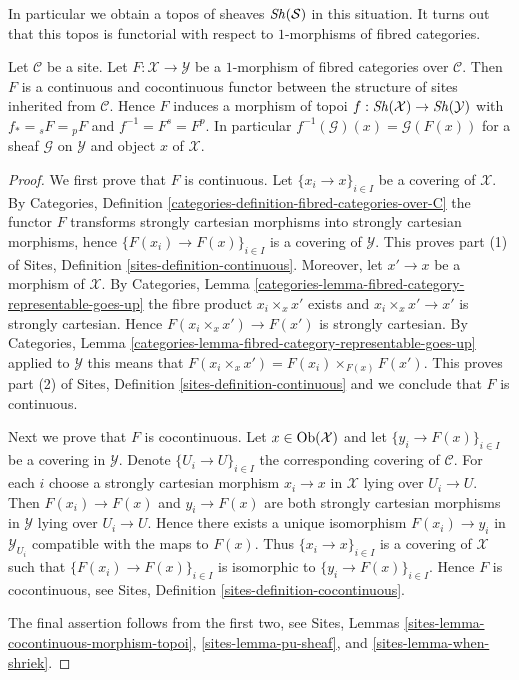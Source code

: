 \noindent
In particular we obtain a topos of sheaves $\mathop{\mathit{Sh}}\nolimits(\mathcal{S})$
in this situation. It turns out that this topos is functorial with respect
to $1$-morphisms of fibred categories.

\begin{lemma}
\label{lemma-topology-inherited-functorial}
Let $\mathcal{C}$ be a site. Let $F : \mathcal{X} \to \mathcal{Y}$
be a $1$-morphism of fibred categories over $\mathcal{C}$.
Then $F$ is a continuous and cocontinuous functor between the structure
of sites inherited from $\mathcal{C}$. Hence $F$ induces a morphism of topoi
$f : \mathop{\mathit{Sh}}\nolimits(\mathcal{X}) \to \mathop{\mathit{Sh}}\nolimits(\mathcal{Y})$ with
$f_* = {}_sF = {}_pF$ and $f^{-1} = F^s = F^p$. In particular
$f^{-1}(\mathcal{G})(x) = \mathcal{G}(F(x))$
for a sheaf $\mathcal{G}$ on $\mathcal{Y}$ and object $x$ of $\mathcal{X}$.
\end{lemma}

\begin{proof}
We first prove that $F$ is continuous.
Let $\{x_i \to x\}_{i \in I}$ be a covering of $\mathcal{X}$. By
Categories, Definition \ref{categories-definition-fibred-categories-over-C}
the functor $F$ transforms strongly cartesian morphisms into strongly
cartesian morphisms, hence $\{F(x_i) \to F(x)\}_{i \in I}$ is a covering
of $\mathcal{Y}$. This proves part (1) of
Sites, Definition \ref{sites-definition-continuous}.
Moreover, let $x' \to x$ be a morphism of $\mathcal{X}$. By
Categories, Lemma \ref{categories-lemma-fibred-category-representable-goes-up}
the fibre product $x_i \times_x x'$ exists and $x_i \times_x x' \to x'$
is strongly cartesian. Hence $F(x_i \times_x x') \to F(x')$ is strongly
cartesian. By
Categories, Lemma \ref{categories-lemma-fibred-category-representable-goes-up}
applied to $\mathcal{Y}$ this means that
$F(x_i \times_x x') = F(x_i) \times_{F(x)} F(x')$.
This proves part (2) of
Sites, Definition \ref{sites-definition-continuous}
and we conclude that $F$ is continuous.

\medskip\noindent
Next we prove that $F$ is cocontinuous.
Let $x \in \mathop{\mathrm{Ob}}\nolimits(\mathcal{X})$ and let $\{y_i \to F(x)\}_{i \in I}$
be a covering in $\mathcal{Y}$. Denote $\{U_i \to U\}_{i \in I}$ the
corresponding covering of $\mathcal{C}$. For each $i$ choose a strongly
cartesian morphism $x_i \to x$ in $\mathcal{X}$ lying over $U_i \to U$.
Then $F(x_i) \to F(x)$ and $y_i \to F(x)$ are both strongly cartesian
morphisms in $\mathcal{Y}$ lying over $U_i \to U$. Hence there exists
a unique isomorphism $F(x_i) \to y_i$ in $\mathcal{Y}_{U_i}$ compatible
with the maps to $F(x)$. Thus $\{x_i \to x\}_{i \in I}$ is a covering of
$\mathcal{X}$ such that $\{F(x_i) \to F(x)\}_{i \in I}$ is isomorphic to
$\{y_i \to F(x)\}_{i \in I}$. Hence $F$ is cocontinuous, see
Sites, Definition \ref{sites-definition-cocontinuous}.

\medskip\noindent
The final assertion follows from the first two, see
Sites, Lemmas
\ref{sites-lemma-cocontinuous-morphism-topoi},
\ref{sites-lemma-pu-sheaf}, and
\ref{sites-lemma-when-shriek}.
\end{proof}

